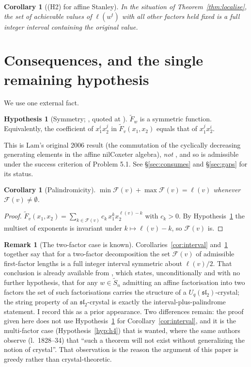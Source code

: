 \documentclass[11pt]{article}
\newtheorem{cor}[thm]{Corollary}
\theoremstyle{definition}
\newtheorem{rem}[thm]{Remark}
\newtheorem{hyp}[thm]{Hypothesis}
\newcommand{\Saff}{\widetilde{S}_{n}}
\newcommand{\Fw}{\widetilde{F}_{w}}
\begin{document}
\begin{cor}[(H2) for affine Stanley]\label{cor:H2}
In the situation of Theorem~\ref{thm:localise}, the set of achievable values of $\ell(w^t)$
with all other factors held fixed is a full integer interval containing the original value.
\end{cor}

\section{Consequences, and the single remaining hypothesis}

We use one external fact.

\begin{hyp}[Symmetry; {\cite{Lam2006}}, quoted at {\cite[l.796, l.802]{WZZ}}]\label{hyp:sym}
$\Fw$ is a symmetric function. Equivalently, the coefficient of $x_1^{i}x_2^{j}$ in
$\widetilde F_v(x_1,x_2)$ equals that of $x_1^{j}x_2^{i}$.
\end{hyp}

This is Lam's original 2006 result (the commutation of the cyclically decreasing generating
elements in the affine nilCoxeter algebra), \emph{not} \cite[Cor.~8.5]{Lam2008}, and so is
admissible under the success criterion of Problem 5.1. See \S\ref{sec:consumes} and
\S\ref{sec:gaps} for its status.

\begin{cor}[Palindromicity]\label{cor:pal}
$\min\mathcal F(v)+\max\mathcal F(v)=\ell(v)$ whenever $\mathcal F(v)\ne\emptyset$.
\end{cor}

\begin{proof}
$\widetilde F_v(x_1,x_2)=\sum_{k\in\mathcal F(v)}c_k\,x_1^{k}x_2^{\ell(v)-k}$ with $c_k>0$. By
Hypothesis~\ref{hyp:sym} the multiset of exponents is invariant under $k\mapsto\ell(v)-k$, so
$\mathcal F(v)$ is.
\end{proof}

\begin{rem}[The two-factor case is known]\label{rem:twofactor}
Corollaries~\ref{cor:interval} and~\ref{cor:pal} together say that for a two-factor
decomposition the set $\mathcal F(v)$ of admissible first-factor lengths is a full integer
interval symmetric about $\ell(v)/2$. That conclusion is already available from
\cite[\texttt{theorem.two factor}]{MorseSchilling}, which states, unconditionally and with no
further hypothesis, that for any $w\in\Saff$ admitting an affine factorisation into two
factors the set of such factorisations carries the structure of a $U_q(\mathfrak{sl}_2)$-crystal;
the string property of an $\mathfrak{sl}_2$-crystal is exactly the interval-plus-palindrome
statement. I record this as a prior appearance. Two differences remain: the proof given here
does not use Hypothesis~\ref{hyp:sym} for Corollary~\ref{cor:interval}, and it is the
multi-factor case (Hypothesis~\ref{hyp:h4}) that is wanted, where the same authors observe
(l.~1828--34) that ``such a theorem will not exist without generalizing the notion of
crystal''. That observation is the reason the argument of this paper is greedy rather than
crystal-theoretic.
\end{rem}
\end{document}
